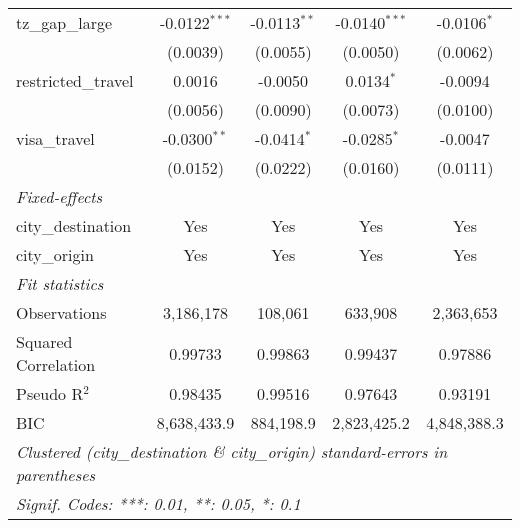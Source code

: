 \begin{tabular}{lcccc}
   tz\_gap\_large                    & -0.0122$^{***}$ & -0.0113$^{**}$ & -0.0140$^{***}$ & -0.0106$^{*}$\\   
                                     & (0.0039)        & (0.0055)       & (0.0050)        & (0.0062)\\   
   restricted\_travel                & 0.0016          & -0.0050        & 0.0134$^{*}$    & -0.0094\\   
                                     & (0.0056)        & (0.0090)       & (0.0073)        & (0.0100)\\   
   visa\_travel                      & -0.0300$^{**}$  & -0.0414$^{*}$  & -0.0285$^{*}$   & -0.0047\\   
                                     & (0.0152)        & (0.0222)       & (0.0160)        & (0.0111)\\   
   \midrule
   \emph{Fixed-effects}\\
   city\_destination                 & Yes             & Yes            & Yes             & Yes\\  
   city\_origin                      & Yes             & Yes            & Yes             & Yes\\  
   \midrule
   \emph{Fit statistics}\\
   Observations                      & 3,186,178       & 108,061        & 633,908         & 2,363,653\\  
   Squared Correlation               & 0.99733         & 0.99863        & 0.99437         & 0.97886\\  
   Pseudo R$^2$                      & 0.98435         & 0.99516        & 0.97643         & 0.93191\\  
   BIC                               & 8,638,433.9     & 884,198.9      & 2,823,425.2     & 4,848,388.3\\  
   \midrule \midrule
   \multicolumn{5}{l}{\emph{Clustered (city\_destination \& city\_origin) standard-errors in parentheses}}\\
   \multicolumn{5}{l}{\emph{Signif. Codes: ***: 0.01, **: 0.05, *: 0.1}}\\
\end{tabular}
\par\endgroup



